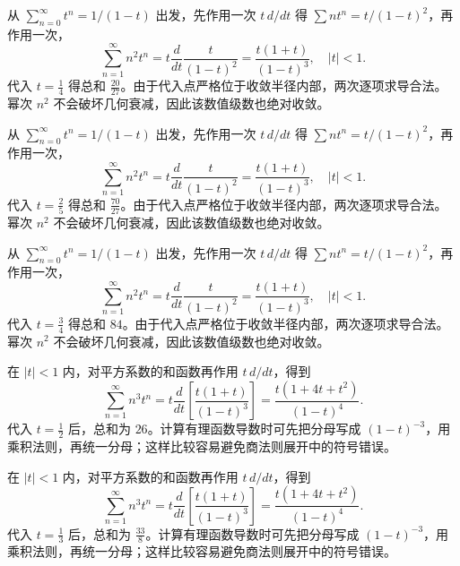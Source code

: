 \documentclass[12pt,fontset=fandol]{ctexart}
\begin{document}
\begin{solve}\label{ans:c27q4}
从 $\sum_{n=0}^\infty t^n=1/(1-t)$ 出发，先作用一次 $t\,d/dt$ 得 $\sum nt^n=t/(1-t)^2$，再作用一次，
\[
\sum_{n=1}^\infty n^2t^n=t\frac d{dt}\frac{t}{(1-t)^2}=\frac{t(1+t)}{(1-t)^3},\quad |t|<1.
\]
代入 $t=\frac{1}{4}$ 得总和 $\frac{20}{27}$。由于代入点严格位于收敛半径内部，两次逐项求导合法。幂次 $n^2$ 不会破坏几何衰减，因此该数值级数也绝对收敛。
\end{solve}

\begin{solve}\label{ans:c27q5}
从 $\sum_{n=0}^\infty t^n=1/(1-t)$ 出发，先作用一次 $t\,d/dt$ 得 $\sum nt^n=t/(1-t)^2$，再作用一次，
\[
\sum_{n=1}^\infty n^2t^n=t\frac d{dt}\frac{t}{(1-t)^2}=\frac{t(1+t)}{(1-t)^3},\quad |t|<1.
\]
代入 $t=\frac{2}{5}$ 得总和 $\frac{70}{27}$。由于代入点严格位于收敛半径内部，两次逐项求导合法。幂次 $n^2$ 不会破坏几何衰减，因此该数值级数也绝对收敛。
\end{solve}

\begin{solve}\label{ans:c27q6}
从 $\sum_{n=0}^\infty t^n=1/(1-t)$ 出发，先作用一次 $t\,d/dt$ 得 $\sum nt^n=t/(1-t)^2$，再作用一次，
\[
\sum_{n=1}^\infty n^2t^n=t\frac d{dt}\frac{t}{(1-t)^2}=\frac{t(1+t)}{(1-t)^3},\quad |t|<1.
\]
代入 $t=\frac{3}{4}$ 得总和 $84$。由于代入点严格位于收敛半径内部，两次逐项求导合法。幂次 $n^2$ 不会破坏几何衰减，因此该数值级数也绝对收敛。
\end{solve}

\begin{solve}\label{ans:c27q7}
在 $|t|<1$ 内，对平方系数的和函数再作用 $t\,d/dt$，得到
\[
\sum_{n=1}^\infty n^3t^n=t\frac d{dt}\left[\frac{t(1+t)}{(1-t)^3}\right]=\frac{t(1+4t+t^2)}{(1-t)^4}.
\]
代入 $t=\frac{1}{2}$ 后，总和为 $26$。计算有理函数导数时可先把分母写成 $(1-t)^{-3}$，用乘积法则，再统一分母；这样比较容易避免商法则展开中的符号错误。
\end{solve}

\begin{solve}\label{ans:c27q8}
在 $|t|<1$ 内，对平方系数的和函数再作用 $t\,d/dt$，得到
\[
\sum_{n=1}^\infty n^3t^n=t\frac d{dt}\left[\frac{t(1+t)}{(1-t)^3}\right]=\frac{t(1+4t+t^2)}{(1-t)^4}.
\]
代入 $t=\frac{1}{3}$ 后，总和为 $\frac{33}{8}$。计算有理函数导数时可先把分母写成 $(1-t)^{-3}$，用乘积法则，再统一分母；这样比较容易避免商法则展开中的符号错误。
\end{solve}
\end{document}
